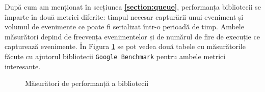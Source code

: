 După cum am menționat în secțiunea \textbf{\ref{section:queue}},
performanța bibliotecii se împarte în două metrici diferite: timpul
necesar capturării unui eveniment și volumul de evenimente ce poate fi
serializat într-o perioadă de timp. Ambele măsurători depind de
frecvența evenimentelor și de numărul de fire de execuție ce capturează
evenimente. În Figura \ref{fig:lib-perf} se pot vedea două tabele cu
măsurătorile făcute cu ajutorul bibliotecii \lstinline{Google Benchmark}
\cite{GoogleBenchmark} pentru ambele metrici interesante.

\begin{figure}[ht]
\centering
{}
\caption{Măsurători de performanță a bibliotecii}
\label{fig:lib-perf}
\end{figure}
